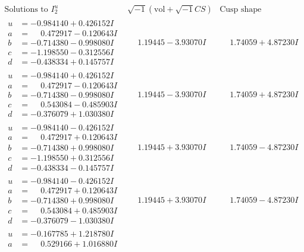 \documentclass[1p]{elsarticle_modified}
\theoremstyle{definition}
\newcommand{\I}{\sqrt{-1}}
\begin{document}
$$\begin{array}{c|c|c}  
\text{Solutions to }I^u_{2}& \I (\text{vol} + \sqrt{-1}CS) & \text{Cusp shape}\\
 \hline 
\begin{aligned}
u &= -0.984140 + 0.426152 I \\
a &= \phantom{-}0.472917 - 0.120643 I \\
b &= -0.714380 - 0.998080 I \\
c &= -1.198550 - 0.312556 I \\
d &= -0.438334 + 0.145757 I\end{aligned}
 & \phantom{-}1.19445 - 3.93070 I & \phantom{-}1.74059 + 4.87230 I \\ \hline\begin{aligned}
u &= -0.984140 + 0.426152 I \\
a &= \phantom{-}0.472917 - 0.120643 I \\
b &= -0.714380 - 0.998080 I \\
c &= \phantom{-}0.543084 - 0.485903 I \\
d &= -0.376079 + 1.030380 I\end{aligned}
 & \phantom{-}1.19445 - 3.93070 I & \phantom{-}1.74059 + 4.87230 I \\ \hline\begin{aligned}
u &= -0.984140 - 0.426152 I \\
a &= \phantom{-}0.472917 + 0.120643 I \\
b &= -0.714380 + 0.998080 I \\
c &= -1.198550 + 0.312556 I \\
d &= -0.438334 - 0.145757 I\end{aligned}
 & \phantom{-}1.19445 + 3.93070 I & \phantom{-}1.74059 - 4.87230 I \\ \hline\begin{aligned}
u &= -0.984140 - 0.426152 I \\
a &= \phantom{-}0.472917 + 0.120643 I \\
b &= -0.714380 + 0.998080 I \\
c &= \phantom{-}0.543084 + 0.485903 I \\
d &= -0.376079 - 1.030380 I\end{aligned}
 & \phantom{-}1.19445 + 3.93070 I & \phantom{-}1.74059 - 4.87230 I \\ \hline\begin{aligned}
u &= -0.167785 + 1.218780 I \\
a &= \phantom{-}0.529166 + 1.016880 I \\

\end{aligned}
\end{array}$$
\end{document}
